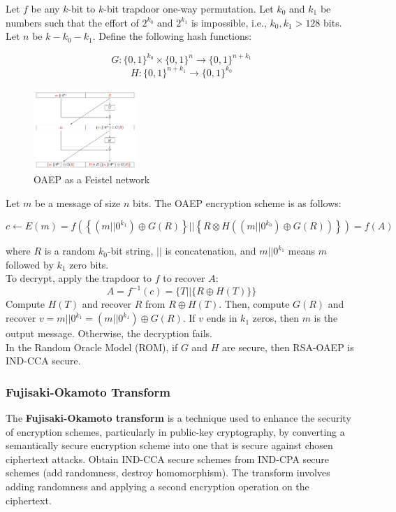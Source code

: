 Let $f$ be any $k$-bit to $k$-bit trapdoor one-way permutation.
Let $k_0$ and $k_1$ be numbers such that the effort of $2^{k_0}$ and $2^{k_1}$ is impossible, i.e., $k_0, k_1 > 128$ bits.
Let $n$ be $k-k_0-k_1$. Define the following hash functions:

\[ G: \{0,1\}^{k_0} \times \{0,1\}^n \rightarrow \{0,1\}^{n+ k_1} \]
\[ H: \{0,1\}^{n+k_1} \rightarrow \{0,1\}^{k_0} \]

\begin{figure}[h!]
    \centering
    \includegraphics[width=0.35\textwidth]{img/oaep.png}
    \caption{OAEP as a Feistel network}
    \label{fig:oaep}
\end{figure}

Let $m$ be a message of size $n$ bits. The OAEP encryption scheme is as follows:

\[ c \leftarrow E(m) = f \left( \left\{ (m || 0^{k_1}) \oplus G(R) \right\}
|| \left\{ R \otimes H((m || 0^{k_0})\oplus G(R))\right\}\right) = f(A)\]

where $R$ is a random $k_0$-bit string, $||$ is concatenation, and $m || 0^{k_1}$ means $m$
followed by $k_1$ zero bits. \\

To decrypt, apply the trapdoor to $f$ to recover $A$:
\[ A = f^{-1}(c) = \{ T || \{R \oplus H(T) \} \} \]
Compute $H(T)$ and recover $R$ from $R \oplus H(T)$. 
Then, compute $G(R)$ and recover $v = m || 0^{k_1} = (m || 0^{k_1}) \oplus G(R)$.
If $v$ ends in $k_1$ zeros, then $m$ is the output message. Otherwise, the decryption fails. \\

In the Random Oracle Model (ROM), if $G$ and $H$ are secure, then RSA-OAEP is IND-CCA secure.

\subsubsection{Fujisaki-Okamoto Transform}
The \textbf{Fujisaki-Okamoto transform} is a technique used to enhance the security of encryption schemes, 
particularly in public-key cryptography,
by converting a semantically secure encryption scheme into one that 
is secure against chosen ciphertext attacks.
Obtain IND-CCA secure schemes from IND-CPA secure schemes (add randomness, destroy homomorphism).
The transform involves adding randomness and applying a second encryption operation on the ciphertext.\\

